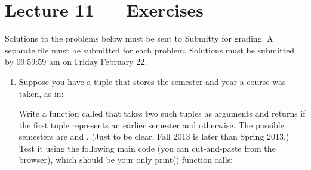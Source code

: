 \documentclass[letterpaper,10pt,english]{sphinxmanual}
\begin{document}
\chapter{Lecture 11 — Exercises}
\label{\detokenize{lecture_notes/lec11_conditionals_exercises/exercises:lecture-11-exercises}}\label{\detokenize{lecture_notes/lec11_conditionals_exercises/exercises::doc}}
Solutions to the problems below must be sent to Submitty for grading.
A separate file must be submitted for each problem. Solutions must be
submitted by 09:59:59 am on Friday February 22.
\begin{enumerate}
\def\theenumi{\arabic{enumi}}
\def\labelenumi{\theenumi .}
\makeatletter\def\p@enumii{\p@enumi \theenumi .}\makeatother
\item {} 
Suppose you have a tuple that stores the semester and year a course
was taken, as in:

\begin{sphinxVerbatim}[commandchars=\\\{\}]
   
\end{sphinxVerbatim}

Write a function called  that takes two
such tuples as arguments and returns  if the first tuple
represents an earlier semester and  otherwise. The
possible semesters are  and . (Just to be
clear, Fall 2013 is later than Spring 2013.) Test it using the
following main code (you can cut-and-paste from the browser), which
should be your only print() function calls:

\begin{sphinxVerbatim}[commandchars=\\\{\}]


\end{sphinxVerbatim}
\end{enumerate}
\end{document}
